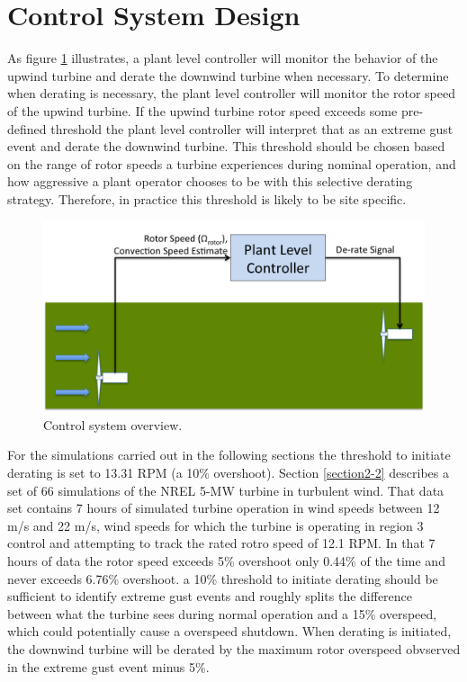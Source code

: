 \section{Control System Design} \label{section4-5}

As figure \ref{fig4-20} illustrates, a plant level controller will monitor the behavior of the upwind turbine and derate the downwind turbine when necessary. To determine when derating is necessary, the plant level controller will monitor the rotor speed of the upwind turbine. If the upwind turbine rotor speed exceeds some pre-defined threshold the plant level controller will interpret that as an extreme gust event and derate the downwind turbine. This threshold should be chosen based on the range of rotor speeds a turbine experiences during nominal operation, and how aggressive a plant operator chooses to be with this selective derating strategy. Therefore, in practice this threshold is likely to be site specific. 

\begin{figure}[htbp]
	\centering
		\includegraphics[width = \linewidth]{Figures/ch4Figures/fig4-20.png}
		
	\caption{Control system overview.}
	\label{fig4-20}
\end{figure}


For the simulations carried out in the following sections the threshold to initiate derating is set to 13.31 RPM (a 10\% overshoot). Section \ref{section2-2} describes a set of 66 simulations of the NREL 5-MW turbine in turbulent wind. That data set contains 7 hours of simulated turbine operation in wind speeds between 12 m/s and 22 m/s, wind speeds for which the turbine is operating in region 3 control and attempting to track the rated rotro speed of 12.1 RPM. In that 7 hours of data the rotor speed exceeds 5\% overshoot only 0.44\% of the time and never exceeds 6.76\% overshoot. a 10\% threshold to initiate derating should be sufficient to identify extreme gust events and roughly splits the difference between what the turbine sees during normal operation and a 15\% overspeed, which could potentially cause a overspeed shutdown. When derating is initiated, the downwind turbine will be derated by the maximum rotor overspeed obvserved in the extreme gust event minus 5\%. 

